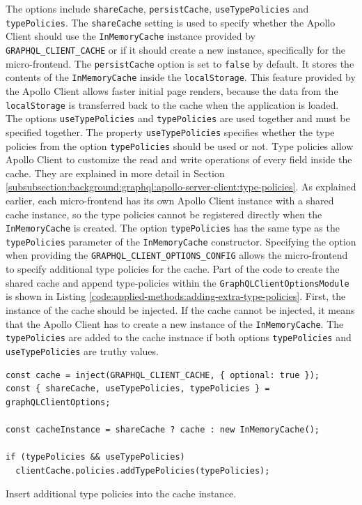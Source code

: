 \noindent The options include \texttt{shareCache}, \texttt{persistCache}, \texttt{useTypePolicies} and \texttt{typePolicies}. The \texttt{shareCache} setting is used to specify whether the Apollo Client should use the \texttt{InMemoryCache} instance provided by \texttt{GRAPHQL\_CLIENT\_CACHE} or if it should create a new instance, specifically for the micro-frontend. The \texttt{persistCache} option is set to \texttt{false} by default. It stores the contents of the \texttt{InMemoryCache} inside the \texttt{localStorage}. This feature provided by the Apollo Client allows faster initial page renders, because the data from the \texttt{localStorage} is transferred back to the cache when the application is loaded. The options \texttt{useTypePolicies} and \texttt{typePolicies} are used together and must be specified together. The property \texttt{useTypePolicies} specifies whether the type policies from the option \texttt{typePolicies} should be used or not. Type policies allow Apollo Client to customize the read and write operations of every field inside the cache. They are explained in more detail in Section \ref{subsubsection:background:graphql:apollo-server-client:type-policies}. As explained earlier, each micro-frontend has its own Apollo Client instance with a shared cache instance, so the type policies cannot be registered directly when the \texttt{InMemoryCache} is created. The option \texttt{typePolicies} has the same type as the \texttt{typePolicies} parameter of the \texttt{InMemoryCache} constructor. Specifying the option when providing the \texttt{GRAPHQL\_CLIENT\_OPTIONS\_CONFIG} allows the micro-frontend to specify additional type policies for the cache. Part of the code to create the shared cache and append type-policies within the \texttt{GraphQLClientOptionsModule} is shown in Listing \ref{code:applied-methods:adding-extra-type-policies}. First, the instance of the cache should be injected. If the cache cannot be injected, it means that the Apollo Client has to create a new instance of the \texttt{InMemoryCache}. The \texttt{typePolicies} are added to the cache instnace if both options \texttt{typePolicies} and \texttt{useTypePolicies} are truthy values.

\ifshowListings
\begin{listing}[H]
\begin{verbatim}
const cache = inject(GRAPHQL_CLIENT_CACHE, { optional: true });
const { shareCache, useTypePolicies, typePolicies } = graphQLClientOptions;

const cacheInstance = shareCache ? cache : new InMemoryCache();

if (typePolicies && useTypePolicies)
  clientCache.policies.addTypePolicies(typePolicies);
\end{verbatim}
\caption{Insert additional type policies into the cache instance.}\label{code:applied-methods:adding-extra-type-policies}
\end{listing}
\fi
